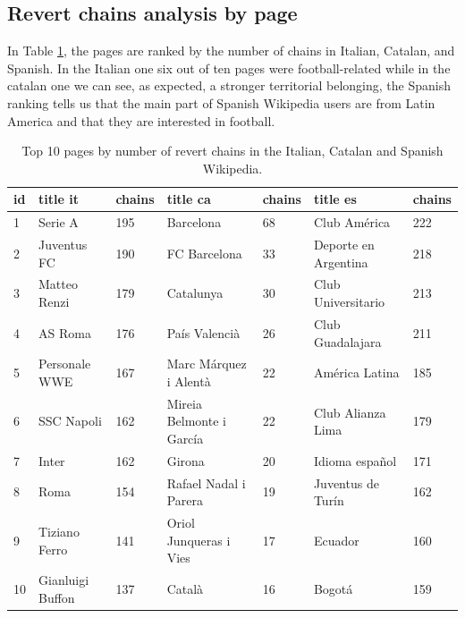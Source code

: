 \subsection{Revert chains analysis by page}
In Table \ref{table:morechains}, the pages are ranked by the number of chains in Italian, Catalan,
and Spanish. In the Italian one six out of ten pages were football-related while in the catalan one
we can see, as expected, a stronger territorial belonging, the Spanish ranking tells us that the
main part of Spanish Wikipedia users are from Latin America and that they are interested in
football. 
\begin{table}[H]
    \centering
    \begin{tabularx}{\columnwidth}{@{}X|ll|ll|ll@{}}
        \midrule
        \textbf{id} & \textbf{title it} & \textbf{chains}& \textbf{title ca} & \textbf{chains}&\textbf{title es} & \textbf{chains} \\ \toprule
        1 & Serie A & 195  & Barcelona & 68 & Club América & 222\\
        2 & Juventus FC & 190  & FC Barcelona & 33 & Deporte en Argentina & 218\\
        3 & Matteo Renzi & 179  & Catalunya & 30 & Club Universitario & 213\\
        4 & AS Roma & 176  &País Valencià& 26 & Club Guadalajara & 211\\
        5 & Personale WWE & 167  &Marc Márquez i Alentà & 22 & América Latina & 185\\
        6 & SSC Napoli & 162  & Mireia Belmonte i García& 22 & Club Alianza Lima & 179\\
        7 & Inter  & 162  &Girona & 20 & Idioma español & 171\\
        8 & Roma & 154 & Rafael Nadal i Parera & 19 & Juventus de Turín & 162\\
        9 & Tiziano Ferro & 141 & Oriol Junqueras i Vies& 17 & Ecuador & 160\\
        10 & Gianluigi Buffon & 137  &Català & 16 & Bogotá & 159\\
        
         \bottomrule
    \end{tabularx}
    
    \caption{Top 10 pages by number of revert chains in the Italian, Catalan and Spanish Wikipedia. \label{table:morechains}}
\end{table}


